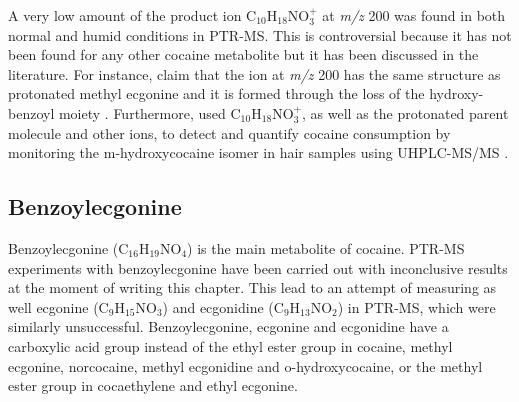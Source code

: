 A very low amount of the product ion C$_{10}$H$_{18}$NO$_3^+$ at \textit{m/z} 200 was found in both normal and humid conditions in PTR-MS.
%
This  is controversial because it has not been found for any other cocaine metabolite but it has been discussed in the literature.
%
For instance, \citeauthor{musshoff2018determination} claim that the ion at \textit{m/z} 200 has the same structure as protonated methyl ecgonine and it is formed through the loss of the hydroxy-benzoyl moiety \cite{musshoff2018determination}.
%
Furthermore, \citeauthor{minoli2019analysis} used C$_{10}$H$_{18}$NO$_3^+$, as well as the protonated parent molecule and other ions, to detect and quantify cocaine consumption by monitoring the m-hydroxycocaine isomer in hair samples using UHPLC-MS/MS  \cite{minoli2019analysis}.
%


%
%

















\subsection{Benzoylecgonine}
Benzoylecgonine (C$_{16}$H$_{19}$NO$_4$) is the main metabolite of cocaine.
%
PTR-MS experiments with benzoylecgonine have been carried out with inconclusive results at the moment of writing this chapter.
%
This lead to an attempt of measuring as well ecgonine (C$_9$H$_{15}$NO$_{3}$) and ecgonidine (C$_9$H$_{13}$NO$_2$) in PTR-MS, which were similarly unsuccessful.
%
Benzoylecgonine, ecgonine and ecgonidine have a carboxylic acid group instead of the ethyl ester group in cocaine, methyl ecgonine, norcocaine, methyl ecgonidine and o-hydroxycocaine, or the methyl ester group in cocaethylene and ethyl ecgonine.
%
% 
%


